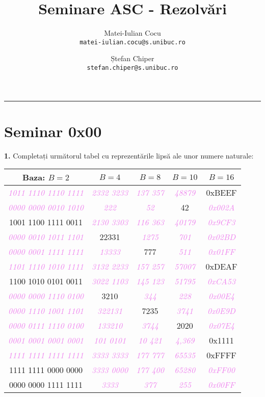 \documentclass[a4paper]{article}
\title{\Large\bfseries Seminare ASC - Rezolvări}
\author{
  Matei-Iulian Cocu\\
  \texttt{matei-iulian.cocu@s.unibuc.ro}
  \and
  Ștefan Chiper\\
  \texttt{stefan.chiper@s.unibuc.ro}
} \date{}
\renewcommand{\arraystretch}{1.4}
\newcommand{\hl}[1]{\textcolor{violet}{\textit{#1}}}
\begin{document}
\maketitle
\vspace{0.5ex}
\hrule
\vspace{0.5ex}
\pagestyle{empty}
\tableofcontents
\newpage
\footnotesize

\section{Seminar 0x00}
\textbf{1.} Completați următorul tabel cu reprezentările lipsă ale unor numere naturale:
\begin{table}[h!]
\centering
\renewcommand{\arraystretch}{1.3}
\setlength{\tabcolsep}{10pt}
\begin{tabular}{|c|c|c|c|c|}
\hline
\textbf{Baza: $B=2$} & \textbf{$B=4$} & \textbf{$B=8$} & \textbf{$B=10$} & \textbf{$B=16$} \\ \hline
 \hl{1011 1110 1110 1111} & \hl{2332 3233} & \hl{137 357} & \hl{48879} & 0xBEEF \\ \hline
 \hl{0000 0000 0010 1010} & \hl{222} & \hl{52} & 42 & \hl{0x002A} \\ \hline
 1001 1100 1111 0011 & \hl{2130 3303} & \hl{116 363} & \hl{40179} & \hl{0x9CF3} \\ \hline
 \hl{0000 0010 1011 1101} & 22331 & \hl{1275} & \hl{701} & \hl{0x02BD} \\ \hline
 \hl{0000 0001 1111 1111} & \hl{13333} & 777 & \hl{511} & \hl{0x01FF} \\ \hline
 \hl{1101 1110 1010 1111} & \hl{3132 2233} & \hl{157 257} & \hl{57007} & 0xDEAF \\ \hline
 1100 1010 0101 0011 & \hl{3022 1103} & \hl{145 123} & \hl{51795} & \hl{0xCA53} \\ \hline
 \hl{0000 0000 1110 0100} & 3210 & \hl{344} & \hl{228} & \hl{0x00E4} \\ \hline
 \hl{0000 1110 1001 1101} & \hl{322131} & 7235 & \hl{3741} & \hl{0x0E9D} \\ \hline
 \hl{0000 0111 1110 0100} & \hl{133210} & \hl{3744} & 2020 & \hl{0x07E4}\\ \hline
 \hl{0001 0001 0001 0001} & \hl{101 0101} & \hl{10 421} & \hl{4,369} & 0x1111 \\ \hline
 \hl{1111 1111 1111 1111} & \hl{3333 3333} & \hl{177 777} & \hl{65535} & 0xFFFF \\ \hline
 1111 1111 0000 0000 & \hl{3333 0000} & \hl{177 400} & \hl{65280} & \hl{0xFF00} \\ \hline
 0000 0000 1111 1111 & \hl{3333} & \hl{377} & \hl{255} & \hl{0x00FF} \\ \hline
\end{tabular}
\end{table}
\vspace{0.75cm}
\end{document}
